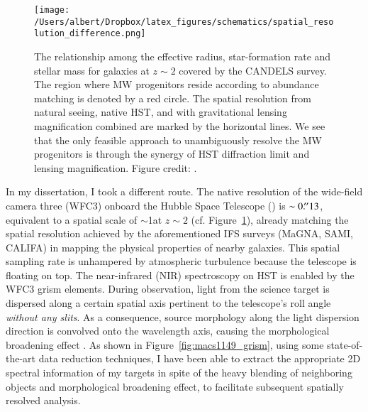 \begin{figure}
    \centering
    \texttt{[image: /Users/albert/Dropbox/latex\_figures/schematics/spatial\_resolution\_difference.png]}
    \caption[The relationship among the effective radius, star-formation rate and stellar mass for galaxies at
    $z\sim2$.]{The relationship among the effective radius, star-formation rate and stellar mass for galaxies at $z\sim2$ covered by the CANDELS survey.
    The region where MW progenitors reside according to abundance matching is denoted by a red circle.
    The spatial resolution from natural seeing, native HST, and with gravitational lensing magnification combined
    are marked by the horizontal lines.
    We see that the only feasible approach to unambiguously resolve the MW progenitors is through the synergy of HST
    diffraction limit and lensing magnification.
    Figure credit: \citet{Wuyts:2012iw}.
    \label{fig:spatial_resolution}}
\end{figure}

In my dissertation, I took a different route.  The native resolution of the wide-field camera three (WFC3)
onboard the Hubble Space Telescope (\hst) is $\sim0\mbox{$.\!^{\prime\prime}$}13$, equivalent to a spatial scale of $\sim$1\kpc at
$z\sim2$ (cf.  Figure~\ref{fig:spatial_resolution}), already matching the spatial resolution achieved by the
aforementioned IFS surveys (\ie MaGNA, SAMI, CALIFA) in mapping the physical properties of nearby galaxies.  This
spatial sampling rate is unhampered by atmospheric turbulence because the telescope is floating on top.  The
near-infrared (NIR) spectroscopy on HST is enabled by the WFC3 grism elements.  During observation, light from the
science target is dispersed along a certain spatial axis pertinent to the telescope's roll angle \emph{without
any slits}.  As a consequence, source morphology along the light dispersion direction is convolved onto the
wavelength axis, causing the morphological broadening effect \citep{vanDokkum:2011cq}.  As shown in
Figure~\ref{fig:macs1149_grism}, using some state-of-the-art data reduction techniques, I have been able to
extract the appropriate 2D spectral information of my targets in spite of the heavy blending of neighboring
objects and morphological broadening effect, to facilitate subsequent spatially resolved analysis.


